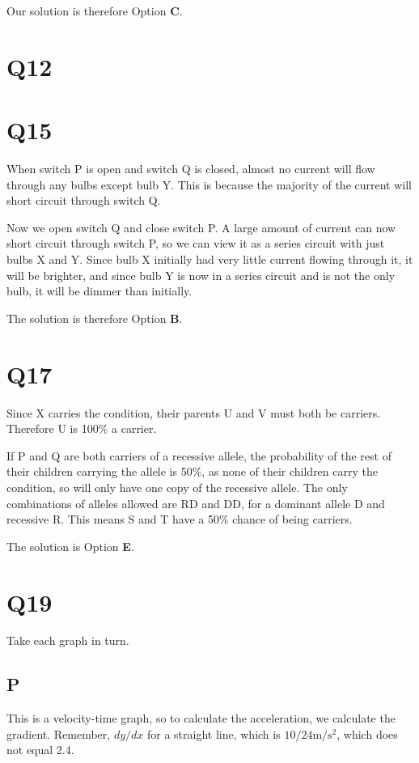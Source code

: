 \documentclass[11pt]{article}
\begin{document}
Our solution is therefore Option \textbf{C}.

\section*{Q12}
\section*{Q15}
When switch P is open and switch Q is closed, almost no current will flow through any bulbs except bulb Y.  This is because the majority of the current will short circuit through switch Q.  

Now we open switch Q and close switch P.  A large amount of current can now short circuit through switch P, so we can view it as a series circuit with just bulbs X and Y.  Since bulb X initially had very little current flowing through it, it will be brighter, and since bulb Y is now in a series circuit and is not the only bulb, it will be dimmer than initially.  

The solution is therefore Option \textbf{B}.

\section*{Q17}

Since X carries the condition, their parents U and V must both be carriers.  Therefore U is 100\% a carrier.

If P and Q are both carriers of a recessive allele, the probability of the rest of their children carrying the allele is 50\%, as none of their children carry the condition, so will only have one copy of the recessive allele.  The only combinations of alleles allowed are RD and DD, for a dominant allele D and recessive R.  This means S and T have a 50\% chance of being carriers.

The solution is Option \textbf{E}.

\section*{Q19}
Take each graph in turn.
\subsection*{P}
This is a velocity-time graph, so to calculate the acceleration, we calculate the gradient.  Remember, $dy/dx$ for a straight line, which is $10/24 \mathrm{m/s^2}$, which does not equal 2.4. 
\end{document}
